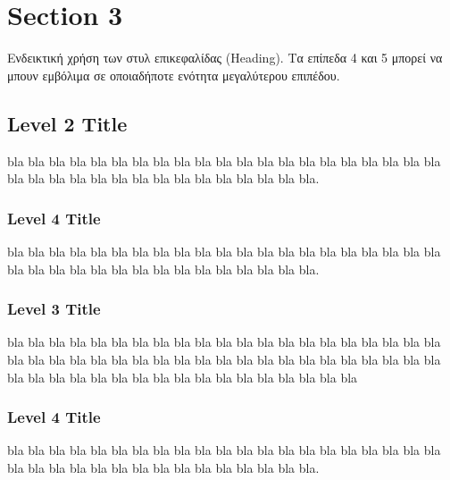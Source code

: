 \section{Section 3}

Ενδεικτική χρήση των στυλ επικεφαλίδας (Heading). Τα επίπεδα 4 και 5 μπορεί να μπουν εμβόλιμα σε οποιαδήποτε ενότητα μεγαλύτερου επιπέδου.

\subsection{Level 2 Title}

\begin{flushleft}
    bla bla bla bla bla bla bla bla bla bla bla bla bla bla bla bla bla bla bla bla bla bla bla bla bla bla bla bla bla bla bla bla bla bla bla bla. 
\end{flushleft}

\subsubsection*{Level 4 Title}

\begin{flushleft}
    bla bla bla bla bla bla bla bla bla bla bla bla bla bla bla bla bla bla bla bla bla bla bla bla bla bla bla bla bla bla bla bla bla bla bla bla. 
\end{flushleft}

\subsubsection{Level 3 Title}

\begin{flushleft}
    bla bla bla bla bla bla bla bla bla bla bla bla bla bla bla bla bla bla bla bla bla bla bla bla bla bla bla bla bla bla bla bla bla bla bla bla bla bla bla bla bla bla bla bla bla bla bla bla bla bla bla bla bla bla bla bla bla bla bla 
\end{flushleft}

\subsubsection*{Level 4 Title}

\begin{flushleft}
    bla bla bla bla bla bla bla bla bla bla bla bla bla bla bla bla bla bla bla bla bla bla bla bla bla bla bla bla bla bla bla bla bla bla bla bla. 
\end{flushleft}